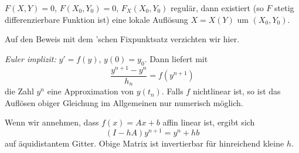 \begin{theorem}
    $F(X,Y)=0$, $F(X_0,Y_0)=0$, $F_X(X_0,Y_0)$ regulär, dann existiert (so $F$ stetig differenzierbare Funktion ist) eine lokale Auflösung $X=X(Y)$ um $(X_0,Y_0)$.
\end{theorem}

Auf den Beweis mit dem 'schen Fixpunktsatz verzichten wir hier.

\begin{example}
    \emph{Euler implizit:} $y'=f(y)$, $y(0)=y_0$. Dann liefert mit
    $$
    \frac{y^{n+1}-y^n}{h_n}=f(y^{n+1})
    $$
    die Zahl $y^n$ eine Approximation von $y(t_n)$. Falls $f$ nichtlinear ist, so ist das Auflösen obiger Gleichung im Allgemeinen nur numerisch möglich.

    Wenn wir annehmen, dass $f(x)=Ax+b$ affin linear ist, ergibt sich
    $$
    (I-hA)y^{n+1}=y^n+hb
    $$
    auf äquidistantem Gitter. Obige Matrix ist invertierbar für hinreichend kleine $h$.
\end{example}